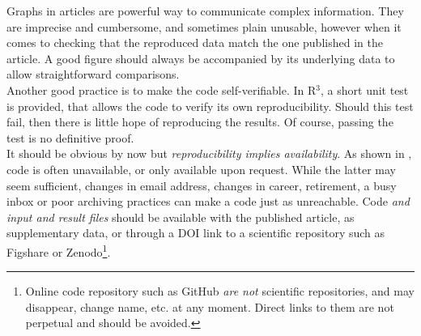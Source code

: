 \documentclass[a4paper,11pt]{article}
\begin{document}
Graphs in articles are powerful way to communicate complex information. They are imprecise and cumbersome, and sometimes plain unusable, however when it comes to checking that the reproduced data match the one published in the article. A good figure should always be accompanied by its underlying data to allow straightforward comparisons.\\

Another good practice is to make the code self-verifiable. In R$^3$, a short unit test is provided, that allows the code to verify its own reproducibility. Should this test fail, then there is little hope of reproducing the results. Of course, passing the test is no definitive proof.\\

It should be obvious by now but \emph{reproducibility implies availability}. As shown in \citep{Collberg:2016}, code is often unavailable, or only available upon request. While the latter may seem sufficient, changes in email address, changes in career, retirement, a busy inbox or poor archiving practices can make a code just as unreachable. Code \emph{and input and result files} should be available with the published article, as supplementary data, or through a DOI link to a scientific repository such as Figshare or Zenodo\footnote{Online code repository such as GitHub \emph{are not} scientific repositories, and may disappear, change name, etc. at any moment. Direct links to them are not perpetual and should be avoided.}.\\


 
\end{document}
